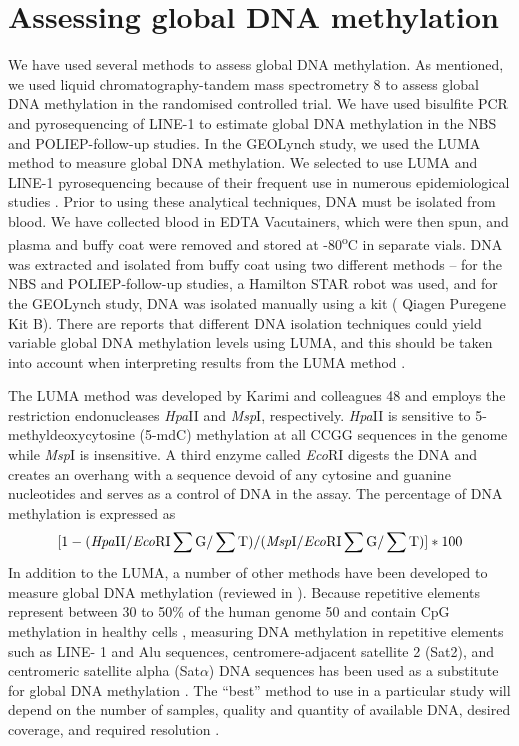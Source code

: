 \section[]{Assessing global DNA methylation} %
\noindent We have used several methods to assess global DNA methylation. As mentioned, we used liquid chromatography-tandem mass spectrometry 8 to assess global DNA methylation in the randomised controlled trial. We have used bisulfite PCR and pyrosequencing of LINE-1 to estimate global DNA methylation in the NBS and POLIEP-follow-up studies. In the GEOLynch study, we used the LUMA method to measure global DNA methylation. We selected to use LUMA and LINE-1 pyrosequencing because of their frequent use in numerous epidemiological studies \cite{c745,c746}. Prior to using these analytical techniques, DNA must be isolated from blood. We have collected blood in EDTA Vacutainers, which were then spun, and plasma and buffy coat were removed and stored at -80\textsuperscript{o}C in separate vials. DNA was extracted and isolated from buffy coat using two different methods -- for the NBS and POLIEP-follow-up studies, a Hamilton STAR robot was used, and for the GEOLynch study, DNA was isolated manually using a kit (
Qiagen Puregene Kit B). There are reports that different DNA isolation techniques could yield variable global DNA methylation levels using LUMA, and this should be taken into account when interpreting results from the LUMA method \cite{c747}.

\noindent The LUMA method was developed by Karimi and colleagues 48 and employs the restriction endonucleases \emph{Hpa}II and \emph{Msp}I, respectively. \emph{Hpa}II is sensitive to 5-methyldeoxycytosine (5-mdC) methylation at all CCGG sequences in the genome while \emph{Msp}I is insensitive. A third enzyme called \emph{Eco}RI digests the DNA and creates an overhang with a sequence devoid of any cytosine and guanine nucleotides and serves as a control of DNA in the assay. The percentage of DNA methylation is expressed as $$[1-(\text{\emph{Hpa}II}  / \text{\emph{Eco}RI}  \sum \text{G}/  \sum \text{T})/( \text{\emph{Msp}I} / \text{\emph{Eco}RI}  \sum \text{G}/  \sum \text{T})]*100$$ In addition to the LUMA, a number of other methods have been developed to measure global DNA methylation (reviewed in \cite{c749}). Because repetitive elements represent between 30 to 50\% of the human genome 50 and contain CpG methylation in healthy cells \cite{c751}, measuring DNA methylation in repetitive elements such as LINE-
1 and Alu sequences, centromere-adjacent satellite 2 (Sat2), and centromeric satellite alpha (Sat$\alpha$) DNA sequences has been used as a substitute for global DNA methylation \cite{c752}. The ``best'' method to use in a particular study will depend on the number of samples, quality and quantity of available DNA, desired coverage, and required resolution \cite{c749}.

